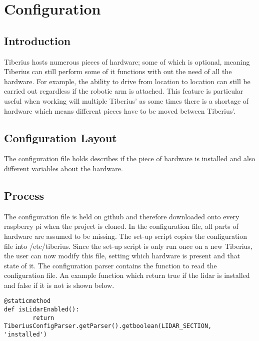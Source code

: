 \section{Configuration}
\pagestyle{aidan}
\label{configuration}
\subsection{Introduction}
Tiberius hosts numerous pieces of hardware; some of which is optional, meaning Tiberius can still perform some of it functions with out the need of all the hardware. For example, the ability to drive from location to location can still be carried out regardless if the robotic arm is attached.  
\newline
This feature is particular useful when working will multiple Tiberius' as some times there is a shortage of hardware which means different pieces have to be moved between Tiberius'.

\subsection{Configuration Layout}
The configuration file holds describes if the piece of hardware is installed and also different variables about the hardware. 

\subsection{Process}
The configuration file is held on github and therefore downloaded onto every raspberry pi when the project is cloned. In the configuration file, all parts of hardware are assumed to be missing. 
The set-up script copies the configuration file into /etc/tiberius. Since the set-up script is only run once on a new Tiberius, the user can now modify this file, setting which hardware is present and that state of it. 
\newline
The configuration parser contains the function to read the configuration file. An example function which return true if the lidar is installed and false if it is not is shown below.
\begin{lstlisting}[style=custompython]
@staticmethod
def isLidarEnabled():
        return TiberiusConfigParser.getParser().getboolean(LIDAR_SECTION, 'installed')
\end{lstlisting} 
